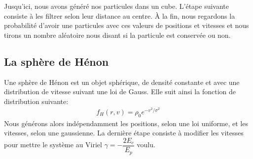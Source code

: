 
			Jusqu'ici, nous avons généré nos particules dans un cube. L'étape suivante consiste à les
			filtrer selon leur distance au centre. À la fin, nous regardons la probabilité d'avoir une
			particules avec ces valeurs de positions et vitesses et nous tirons un nombre aléatoire nous
			disant si la particule est conservée ou non.




		\subsection{La sphère de Hénon}

			Une sphère de Hénon est un objet sphérique, de densité
			constante et avec une distribution de vitesse suivant
			une loi de Gauss. Elle suit ainsi la fonction de
			distribution suivante:
			\begin{align}
				f_H(r, v) = \rho_0 e^{-v^2/\sigma^2}
			\end{align}
			Nous générons alors indépendamment les positions, selon
			une loi uniforme, et les vitesses, selon une
			gaussienne.
			La dernière étape consiste à modifier les vitesses pour mettre le système au Viriel $\gamma =
			-\dfrac{2E_c}{E_p}$ voulu.

